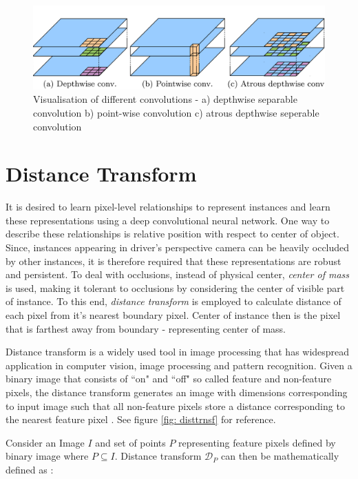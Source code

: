 \begin{figure}[!ht]
	 \centering 
        \includegraphics[scale=0.26]{Graphics/Fundamentals/AtrousSeperableConv}
	    \caption[Atrous Seperable Convolutions]{Visualisation of different convolutions - a) depthwise separable convolution b) point-wise convolution c) atrous depthwise seperable convolution \cite{Deeplabv3+:journals/corr/abs-1802-02611}}
	\label{fig: atroussepconv} 
\end{figure}



\newpage
\section{Distance Transform}
It is desired to learn pixel-level relationships to represent instances and learn these representations using a deep convolutional neural network. One way to describe these relationships is relative position with respect to center of object. Since, instances appearing in driver's perspective camera can be heavily occluded by other instances, it is therefore required that these representations are robust and persistent. To deal with occlusions, instead of physical center, \textit{center of mass} is used, making it tolerant to occlusions by considering the center of visible part of instance. To this end, \textit{distance transform} is employed to calculate distance of each pixel from it's nearest boundary pixel. Center of instance then is the pixel that is farthest away from boundary - representing center of mass. 

Distance transform is a widely used tool in image processing that has widespread application in computer vision, image processing and pattern recognition. Given a binary image that consists of ``on" and ``off" so called feature and non-feature pixels, the distance transform generates an image with dimensions corresponding to input image such that all non-feature pixels store a distance corresponding to the nearest feature pixel \cite{Borgefors1986}. See figure \ref{fig: disttrnsf} for reference.

Consider an Image $I$ and set of points $P$ representing feature pixels defined by binary image where $P \subseteq I$. Distance transform  $\mathcal{D}_{P}$ can then be mathematically defined as :

